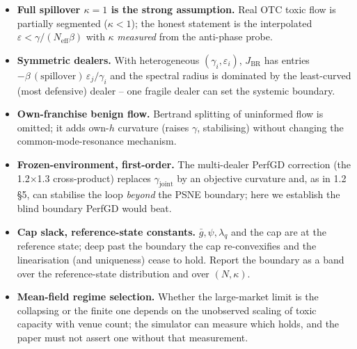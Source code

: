 \documentclass[11pt]{article}
\newcommand{\eps}{\varepsilon}
\newcommand{\gbar}{\bar g}
\newcommand{\BR}{\mathrm{BR}}
\newcommand{\Neff}{N_{\mathrm{eff}}}
\newcommand{\gj}{\gamma_{\mathrm{joint}}}
\begin{document}
\begin{itemize}[leftmargin=1.4em]
  \item \textbf{Full spillover $\kappa=1$ is the strong assumption.} Real OTC toxic
  flow is partially segmented ($\kappa<1$); the honest statement is the interpolated
  $\eps<\gamma/(\Neff\beta)$ with $\kappa$ \emph{measured} from the anti-phase probe.
  \item \textbf{Symmetric dealers.} With heterogeneous $(\gamma_i,\eps_i)$, $J_{\BR}$
  has entries $-\beta\,(\text{spillover})\,\eps_j/\gamma_i$ and the spectral radius is
  dominated by the least-curved (most defensive) dealer -- one fragile dealer can set
  the systemic boundary.
  \item \textbf{Own-franchise benign flow.} Bertrand splitting of uninformed flow is
  omitted; it adds own-$h$ curvature (raises $\gamma$, stabilising) without changing
  the common-mode-resonance mechanism.
  \item \textbf{Frozen-environment, first-order.} The multi-dealer PerfGD correction
  (the 1.2$\times$1.3 cross-product) replaces $\gj$ by an objective curvature and, as
  in 1.2\,\S5, can stabilise the loop \emph{beyond} the PSNE boundary; here we
  establish the blind boundary PerfGD would beat.
  \item \textbf{Cap slack, reference-state constants.} $\gbar,\psi,\lambda_q$ and the
  cap are at the reference state; deep past the boundary the cap re-convexifies and
  the linearisation (and uniqueness) cease to hold. Report the boundary as a band over
  the reference-state distribution and over $(N,\kappa)$.
  \item \textbf{Mean-field regime selection.} Whether the large-market limit is the
  collapsing or the finite one depends on the unobserved scaling of toxic capacity
  with venue count; the simulator can measure which holds, and the paper must not
  assert one without that measurement.
\end{itemize}

\end{document}
